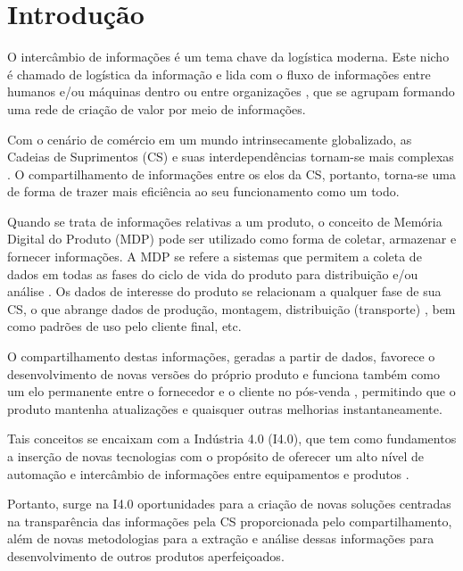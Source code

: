 \chapter{Introdução}
\label{cha:introducao}

O intercâmbio de informações é um tema chave da logística moderna. Este nicho é chamado de logística da informação e lida com o fluxo de informações entre humanos e/ou máquinas dentro ou entre organizações \cite{haftor2011information}, que se agrupam formando uma rede de criação de valor por meio de informações.

Com o cenário de comércio em um mundo intrinsecamente globalizado, as Cadeias de Suprimentos (CS) e suas interdependências tornam-se mais complexas \cite{surana2005supplychain}. O compartilhamento de informações entre os elos da CS, portanto, torna-se uma de forma de trazer mais eficiência ao seu funcionamento como um todo.

Quando se trata de informações relativas a um produto, o conceito de Memória Digital do Produto (MDP) pode ser utilizado como forma de coletar, armazenar e fornecer informações. A MDP se refere a sistemas que permitem a coleta de dados em todas as fases do ciclo de vida do produto para distribuição e/ou análise \cite{wahlster2007digitalmemory}. Os dados de interesse do produto se relacionam a qualquer fase de sua CS, o que abrange dados de produção, montagem, distribuição (transporte) \cite{brandherm2011productmemory}, bem como padrões de uso pelo cliente final, etc.

O compartilhamento destas informações, geradas a partir de dados, favorece o desenvolvimento de novas versões do próprio produto e funciona também como um elo permanente entre o fornecedor e o cliente no pós-venda \cite{brandherm2011productmemory}, permitindo que o produto mantenha atualizações e quaisquer outras melhorias instantaneamente.

Tais conceitos se encaixam com a Indústria 4.0 (I4.0), que tem como fundamentos a inserção de novas tecnologias com o propósito de oferecer um alto nível de automação e intercâmbio de informações entre equipamentos e produtos \cite{lasi2014industryfour}.

Portanto, surge na I4.0 oportunidades para a criação de novas soluções centradas na transparência das informações pela CS \cite{lasi2014industryfour} proporcionada pelo compartilhamento, além de novas metodologias para a extração e análise dessas informações para desenvolvimento de outros produtos aperfeiçoados.

